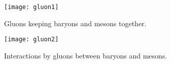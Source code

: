 \begin{figure}\begin{center}
\texttt{[image: gluon1]}%
\caption{Gluons keeping baryons and mesons together.}\label{fig:gluon1}
\end{center}\end{figure}

\begin{figure}\begin{center}
\texttt{[image: gluon2]}%
\caption{Interactions by gluons between baryons and mesons.}\label{fig:gluon2}
\end{center}\end{figure}




